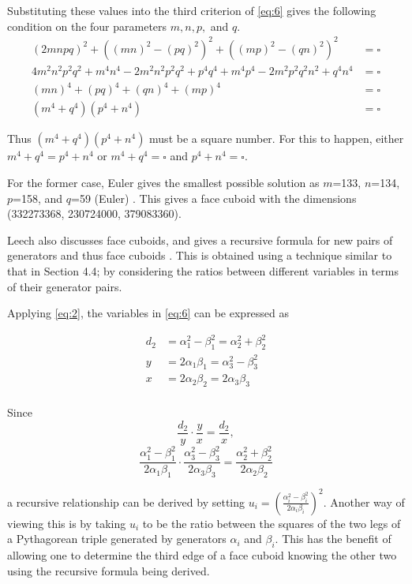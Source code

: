 \documentclass[11pt]{article}
\begin{document}
Substituting these values into the third criterion of \eqref{eq:6} gives the following condition on the four parameters $m, n, p,$ and $q$.
\begin{equation*}
\begin{aligned}
(2mnpq)^2+((mn)^2-(pq)^2)^2+((mp)^2-(qn)^2)^2&=\square \\
4m^2n^2p^2q^2+m^4n^4-2m^2n^2p^2q^2+p^4q^4+m^4p^4-2m^2p^2q^2n^2+q^4n^4&=\square \\
(mn)^4+(pq)^4+(qn)^4+(mp)^4&=\square \\
(m^4+q^4)(p^4+n^4)&=\square
\end{aligned}
\end{equation*}

Thus $(m^4+q^4)(p^4+n^4)$ must be a square number. For this to happen, either $m^4+q^4=p^4+n^4$ or $m^4+q^4=\square$ and $p^4+n^4=\square$.

For the former case, Euler gives the smallest possible solution as $m$=133, $n$=134, $p$=158, and $q$=59 (Euler) \cite{eulerface}. This gives a face cuboid with the dimensions (332273368, 230724000, 379083360).

Leech also discusses face cuboids, and gives a recursive formula for new pairs of generators and thus face cuboids \cite{leech}. This is obtained using a technique similar to that in Section 4.4; by considering the ratios between different variables in terms of their generator pairs.

Applying \eqref{eq:2}, the variables in \eqref{eq:6} can be expressed as

\begin{equation*}
\begin{aligned}
d_2&=\alpha_1^2-\beta_1^2=\alpha_2^2+\beta_2^2 \\
y&=2\alpha_1\beta_1=\alpha_3^2-\beta_3^2 \\
x&=2\alpha_2\beta_2=2\alpha_3\beta_3 \\
\end{aligned}
\end{equation*}

Since 
$$\frac{d_2}{y}\cdot\frac{y}{x}=\frac{d_2}{x},$$
\begin{equation}
\frac{\alpha_1^2-\beta_1^2}{2\alpha_1\beta_1}\cdot\frac{\alpha_3^2-\beta_3^2}{2\alpha_3\beta_3}=\frac{\alpha_2^2+\beta_2^2}{2\alpha_2\beta_2}
\label{eq:7}
\end{equation}

a recursive relationship can be derived by setting $u_i=\left(\frac{\alpha_i^2-\beta_i^2}{2\alpha_i\beta_i}\right)^2$. Another way of viewing this is by taking $u_i$ to be the ratio between the squares of the two legs of a Pythagorean triple generated by generators $\alpha_i$ and $\beta_i$. This has the benefit of allowing one to determine the third edge of a face cuboid knowing the other two using the recursive formula being derived.
\end{document}

